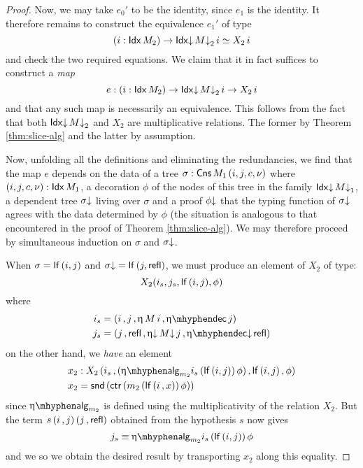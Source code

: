 \begin{proof}
  Now, we may take $e_0'$ to be the identity, since $e_1$ is the
  identity.  It therefore remains to construct the equivalence $e_1'$
  of type
  \[ (i : \mathsf{Idx}\, M_2) \to \mathsf{Idx}{\downarrow}\, M{\downarrow}_2\, i \simeq X_2\, i \] and check
  the two required equations.  We claim that it in fact suffices to
  construct a \emph{map}
  \[ e : (i : \mathsf{Idx}\, M_2) \to \mathsf{Idx}{\downarrow}\, M{\downarrow}_2\, i \to X_2\, i \] and that any
  such map is necessarily an equivalence.  This follows from the fact
  that both $\mathsf{Idx}{\downarrow}\, M{\downarrow}_2$ and $X_2$ are multiplicative relations.
  The former by Theorem \ref{thm:slice-alg} and the latter by
  assumption.

  Now, unfolding all the definitions and eliminating the redundancies,
  we find that the map $e$ depends on the data of a tree
  $\sigma : \mathsf{Cns}\, M_1\, (i,j,c,\nu)$ where $(i,j,c,\nu) : \mathsf{Idx}\, M_1$, a
  decoration $\phi$ of the nodes of this tree in the family
  $\mathsf{Idx}{\downarrow}\, M{\downarrow}_1$, a dependent tree $\sigma{\downarrow}$ living over $\sigma$
  and a proof $\phi{\downarrow}$ that the typing function of $\sigma{\downarrow}$ agrees
  with the data determined by $\phi$ (the situation is analogous to
  that encountered in the proof of Theorem \ref{thm:slice-alg}).  We
  may therefore proceed by simultaneous induction on $\sigma$ and
  $\sigma{\downarrow}$.
  
  When $\sigma = \mathsf{lf}\, (i , j)$ and $\sigma{\downarrow} = \mathsf{lf}\, (j , \mathsf{refl})$, we
  must produce an element of $X_2$ of type:
  \[ X_2 (i_s , j_s , \mathsf{lf}\, (i , j) , \phi) \]
  where
  \begin{align*}
    i_s &= (i \,, j \,, \upeta\, M\, i \,, \etadec j) \\
    j_s &= (j \,, \refl\, , \upetad\, M\da\, j \, , \etadecd \refl) 
  \end{align*}
  on the other hand, we \emph{have} an element
  \begin{align*}
    &x_2 : X_2\, (i_s \,, (\upeta\alg_{m_2} i_s\, (\lf (i , j))\, \phi) \,, \lf (i , j) \,, \phi) \\
    &x_2 = \snd (\ctr (m_2\, (\lf (i \,, x))\, \phi)) 
  \end{align*}
  since $\upeta\alg_{m_2}$ is defined using the multiplicativity of the
  relation $X_2$.  But the term $s\, (i \,, j)\, (j \,, \mathsf{refl})$
  obtained from the hypothesis $s$ now gives
  \[ j_s \equiv \upeta\alg_{m_2} i_s\, (\lf (i , j))\, \phi \] and we
  so we obtain the desired result by transporting $x_2$ along this
  equality.


\end{proof}
